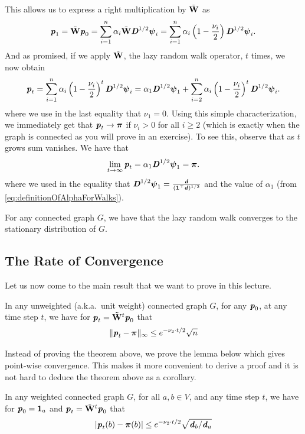 This allows us to express a right multiplication by ${\tilde{\mathbf{W}}}$ as
\[
    \boldsymbol{\mathit{p}}_1 = {\tilde{\mathbf{W}}} \boldsymbol{\mathit{p}}_0 = \sum_{i=1}^n \alpha_i {\tilde{\mathbf{W}}} \boldsymbol{\mathit{D}}^{1/2} \boldsymbol{\mathit{\psi}}_i = \sum_{i=1}^n \alpha_i \left(1-\frac{\nu_i}{2}\right) \boldsymbol{\mathit{D}}^{1/2} \boldsymbol{\mathit{\psi}}_i.
\]
And as promised, if we apply ${\tilde{\mathbf{W}}}$, the lazy random walk operator, $t$ times, we now obtain
\begin{align}\label{eq:distributionRandomWalkTSteps}
    \boldsymbol{\mathit{p}}_t = \sum_{i=1}^n \alpha_i \left(1-\frac{\nu_i}{2}\right)^t \boldsymbol{\mathit{D}}^{1/2} \boldsymbol{\mathit{\psi}}_i = \alpha_1 \boldsymbol{\mathit{D}}^{1/2} \boldsymbol{\mathit{\psi}}_1 + \sum_{i=2}^n \alpha_i \left(1-\frac{\nu_i}{2}\right)^t \boldsymbol{\mathit{D}}^{1/2} \boldsymbol{\mathit{\psi}}_i.
\end{align}
where we use in the last equality that $\nu_1 = 0$. Using this simple characterization, we immediately get that $\boldsymbol{\mathit{p}}_t \to \boldsymbol{\pi}$ if $\nu_i > 0$ for all $i \geq 2$ (which is exactly when the graph is connected as you will prove in an exercise). To see this, observe that as $t$ grows sum vanishes. We have that
\[
    \lim_{t \to \infty} \boldsymbol{\mathit{p}}_t = \alpha_1 \boldsymbol{\mathit{D}}^{1/2} \boldsymbol{\mathit{\psi}}_1 = \boldsymbol{\pi}.
\]
where we used in the equality that $\boldsymbol{\mathit{D}}^{1/2} \boldsymbol{\mathit{\psi}}_1 = \frac{\boldsymbol{\mathit{d}} }{(\boldsymbol{1}^{\top} \boldsymbol{\mathit{d}})^{1/2}}$ and the value of $\alpha_1$ (from \ref{eq:definitionOfAlphaForWalks}).

\begin{theorem}
For any connected graph $G$, we have that the lazy random walk converges to the stationary distribution of $G$.
\end{theorem}

\subsection{The Rate of Convergence}

Let us now come to the main result that we want to prove in this lecture. 

\begin{theorem}
In any unweighted (a.k.a.\ unit weight) connected graph $G$, for any $\boldsymbol{\mathit{p}}_0$, at any time step $t$, we have for $\boldsymbol{\mathit{p}}_t = {\tilde{\mathbf{W}}}^t \boldsymbol{\mathit{p}}_0$ that
\[
\| \boldsymbol{\mathit{p}}_t - \boldsymbol{\pi} \|_{\infty}  \leq e^{-\nu_2 \cdot t/2} \sqrt{n} 
\]
\end{theorem}

Instead of proving the theorem above, we prove the lemma below which gives point-wise convergence. This makes it more convenient to derive a proof and it is not hard to deduce the theorem above as a corollary.

\begin{lemma}
  In any weighted connected graph $G$, for all $a,b \in V$, and any time step $t$, we have for $\boldsymbol{\mathit{p}}_0 = \boldsymbol{1}_a$ and $\boldsymbol{\mathit{p}}_t = {\tilde{\mathbf{W}}}^t \boldsymbol{\mathit{p}}_0$ that
\[
  |\boldsymbol{\mathit{p}}_t(b) - \boldsymbol{\pi}(b)| \leq e^{-\nu_2 \cdot t/2} \sqrt{\boldsymbol{\mathit{d}}_b/\boldsymbol{\mathit{d}}_a} 
\]
\end{lemma}

